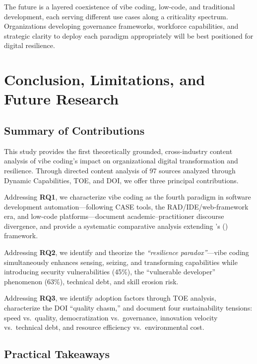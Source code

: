 \documentclass[preprint,12pt,authoryear]{elsarticle}
\begin{document}
The future is a layered coexistence of vibe coding, low-code, and traditional development, each serving different use cases along a criticality spectrum. Organizations developing governance frameworks, workforce capabilities, and strategic clarity to deploy each paradigm appropriately will be best positioned for digital resilience.


\section{Conclusion, Limitations, and Future Research}
\label{sec:conclusion}

\subsection{Summary of Contributions}

This study provides the first theoretically grounded, cross-industry content analysis of vibe coding's impact on organizational digital transformation and resilience. Through directed content analysis of 97 sources analyzed through Dynamic Capabilities, TOE, and DOI, we offer three principal contributions.

Addressing \textbf{RQ1}, we characterize vibe coding as the fourth paradigm in software development automation---following CASE tools, the RAD/IDE/web-framework era, and low-code platforms---document academic--practitioner discourse divergence, and provide a systematic comparative analysis extending \citeauthor{Sanchis2020}'s (\citeyear{Sanchis2020}) framework.

Addressing \textbf{RQ2}, we identify and theorize the \emph{``resilience paradox''}---vibe coding simultaneously enhances sensing, seizing, and transforming capabilities while introducing security vulnerabilities (45\%), the ``vulnerable developer'' phenomenon (63\%), technical debt, and skill erosion risk.

Addressing \textbf{RQ3}, we identify adoption factors through TOE analysis, characterize the DOI ``quality chasm,'' and document four sustainability tensions: speed vs.\ quality, democratization vs.\ governance, innovation velocity vs.\ technical debt, and resource efficiency vs.\ environmental cost.


\subsection{Practical Takeaways}
\end{document}
